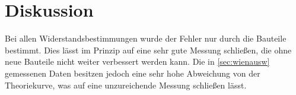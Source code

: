 \section{Diskussion}
\label{sec:Diskussion}

Bei allen Widerstandsbestimmungen wurde der Fehler nur durch die Bauteile
bestimmt. Dies lässt im Prinzip auf eine sehr gute Messung schließen, die ohne
neue Bauteile nicht weiter verbessert werden kann. 
Die in \autoref{sec:wienausw} gemessenen Daten besitzen jedoch eine sehr hohe Abweichung 
von der Theoriekurve, was auf eine unzureichende Messung schließen lässt.